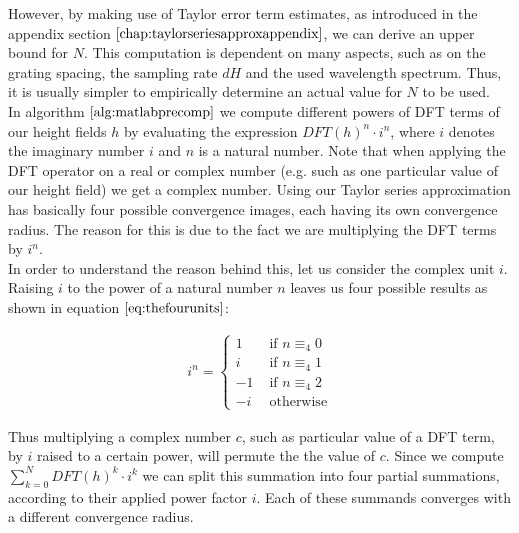 However, by making use of Taylor error term estimates, as introduced in the appendix section $\ref{chap:taylorseriesapproxappendix}$, we can derive an upper bound for $N$. This computation is dependent on many aspects, such as on the grating spacing, the sampling rate $dH$ and the used wavelength spectrum. Thus, it is usually simpler to empirically determine an actual value for $N$ to be used. \\

In algorithm $\ref{alg:matlabprecomp}$ we compute different powers of DFT terms of our height fields $h$ by evaluating the expression $DFT(h)^n \cdot i^n$, where $i$ denotes the imaginary number $i$ and $n$ is a natural number. Note that when applying the DFT operator on a real or complex number (e.g. such as one particular value of our height field) we get a complex number. Using our Taylor series approximation has basically four possible convergence images, each having its own convergence radius. The reason for this is due to the fact we are multiplying the DFT terms by $i^n$. \\

In order to understand the reason behind this, let us consider the complex unit $i$. Raising $i$ to the power of a natural number $n$ leaves us four possible results as shown in equation $\ref{eq:thefourunits}$:
 
\begin{align}
  i^n = \left\{ \begin{array}{rl}
  1 &\mbox{ if $n \equiv_4 0$} \\
  i &\mbox{ if $n \equiv_4 1$} \\
  -1 &\mbox{ if $n \equiv_4 2$} \\
  -i &\mbox{ otherwise}
  \end{array} \right.
\label{eq:thefourunits}
\end{align}

Thus multiplying a complex number $c$, such as particular value of a DFT term, by $i$ raised to a certain power, will permute the the value of $c$.
Since we compute $\sum_{k=0}^N DFT(h)^k \cdot i^k$ we can split this summation into four partial summations, according to their applied power factor $i$. Each of these summands converges with a different convergence radius.

